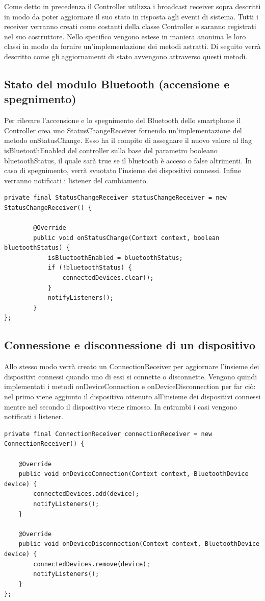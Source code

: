 Come detto in precedenza il Controller utilizza i broadcast receiver sopra descritti in modo da poter aggiornare il suo stato in risposta agli eventi di sistema. Tutti i receiver verranno creati come costanti della classe Controller e saranno registrati nel suo costruttore. Nello specifico vengono estese in maniera anonima le loro classi in modo da fornire un'implementazione dei metodi astratti. Di seguito verrà descritto come gli aggiornamenti di stato avvengono attraverso questi metodi.

\subsection{Stato del modulo Bluetooth (accensione e spegnimento)}
Per rilevare l'accensione e lo spegnimento del Bluetooth dello smartphone il Controller crea uno StatusChangeReceiver fornendo un'implementazione del metodo onStatusChange. Esso ha il compito di assegnare il nuovo valore al flag isBluetoothEnabled del controller sulla base del parametro booleano bluetoothStatus, il quale sarà true se il bluetooth è acceso o false altrimenti. In caso di spegnimento, verrà svuotato l'insieme dei dispositivi connessi. Infine verranno notificati i listener del cambiamento.
\begin{verbatim}
private final StatusChangeReceiver statusChangeReceiver = new StatusChangeReceiver() {

        @Override
        public void onStatusChange(Context context, boolean bluetoothStatus) {
            isBluetoothEnabled = bluetoothStatus;
            if (!bluetoothStatus) {
                connectedDevices.clear();
            }
            notifyListeners();
        }
};
\end{verbatim}

\subsection{Connessione e disconnessione di un dispositivo}
Allo stesso modo verrà creato un ConnectionReceiver per aggiornare l'insieme dei dispositivi connessi quando uno di essi si connette o disconnette. Vengono quindi implementati i metodi onDeviceConnection e onDeviceDisconnection per far ciò: nel primo viene aggiunto il dispositivo ottenuto all'insieme dei dispositivi connessi mentre nel secondo il dispositivo viene rimosso. In entrambi i casi vengono notificati i listener.
\begin{verbatim}
private final ConnectionReceiver connectionReceiver = new ConnectionReceiver() {

    @Override
    public void onDeviceConnection(Context context, BluetoothDevice device) {
        connectedDevices.add(device);
        notifyListeners();
    }

    @Override
    public void onDeviceDisconnection(Context context, BluetoothDevice device) {
        connectedDevices.remove(device);
        notifyListeners();
    }
};
\end{verbatim}

